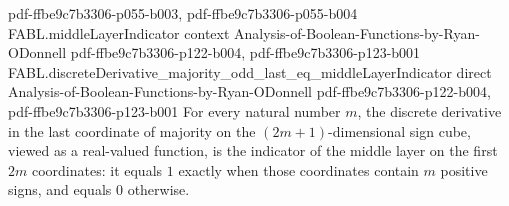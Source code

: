 \begin{theorem}
  {pdf-ffbe9c7b3306-p055-b003,
    pdf-ffbe9c7b3306-p055-b004}
\proofstep
  {FABL.middleLayerIndicator}
  {context}
  {Analysis-of-Boolean-Functions-by-Ryan-ODonnell}
  {pdf-ffbe9c7b3306-p122-b004,
    pdf-ffbe9c7b3306-p123-b001}
\proofstep
  {FABL.discreteDerivative_majority_odd_last_eq_middleLayerIndicator}
  {direct}
  {Analysis-of-Boolean-Functions-by-Ryan-ODonnell}
  {pdf-ffbe9c7b3306-p122-b004,
    pdf-ffbe9c7b3306-p123-b001}
For every natural number $m$, the discrete derivative in the last coordinate of majority
on the $(2m+1)$-dimensional sign cube, viewed as a real-valued function, is the
indicator of the middle layer on the first $2m$ coordinates: it equals $1$ exactly when
those coordinates contain $m$ positive signs, and equals $0$ otherwise.
\end{theorem}

